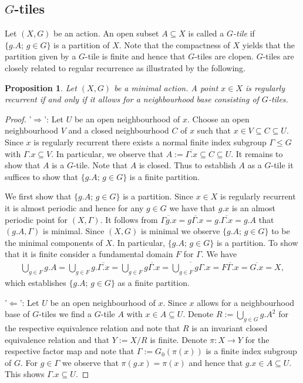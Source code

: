 \documentclass[12pt, reqno]{amsart}
\newtheorem{proposition}[theorem]{Proposition}
\theoremstyle{definition}
\theoremstyle{remark}
\numberwithin{equation}{section}
\theoremstyle{theorem}
\theoremstyle{remark}
\begin{document}
\subsection{$G$-tiles}
\label{subsec:RegularRecurrence_GTiles}
Let $(X,G)$ be an action. 
An open subset $A\subseteq X$ is called a \emph{$G$-tile} if $\{g.A;\, g\in G\}$ is a partition of $X$. Note that the compactness of $X$ yields that the partition given by a $G$-tile is finite and hence that $G$-tiles are clopen. $G$-tiles are closely related to regular recurrence as illustrated by the following. 

\begin{proposition}
\label{pro:regularlyRecurrentPointsAndGTiles}
    Let $(X,G)$ be a minimal action.
    A point $x\in X$ is regularly recurrent if and only if it allows for a neighbourhood base consisting of $G$-tiles. 
\end{proposition}
\begin{proof}
'$\Rightarrow$': 
    Let $U$ be an open neighbourhood of $x$. 
    Choose an open neighbourhood $V$ and a closed neighbourhood $C$ of $x$ such that $x\in V\subseteq C \subseteq U$. 
    Since $x$ is regularly recurrent there exists a normal finite index subgroup $\Gamma\leq G$ with $\Gamma.x\subseteq V$. 
    In particular, we observe that $A:=\overline{\Gamma.x}\subseteq C\subseteq U$. 
    It remains to show that $A$ is a $G$-tile. 
    Note that $A$ is closed. Thus to establish $A$ as a $G$-tile it suffices to show that $\{g.A;\, g\in G\}$ is a finite partition. 

    We first show that $\{g.A;\, g\in G\}$ is a partition.     
    Since $x\in X$ is regularly recurrent it is almost periodic and hence for any $g\in G$ we have that $g.x$ is an almost periodic point for $(X,\Gamma)$. 
    It follows from 
    $
        \overline{\Gamma g.x}
        =\overline{g\Gamma.x}
        =g.\overline{\Gamma.x}
        = g.A
    $
    that $(g.A,\Gamma)$ is minimal. Since $(X,G)$ is minimal we observe $\{g.A;\, g\in G\}$ to be the minimal components of $X$. In particular, $\{g.A;\, g\in G\}$ is a partition. 
    To show that it is finite consider a fundamental domain $F$ for $\Gamma$. 
    We have 
    \begin{align*}
        \bigcup_{g\in F}g.A
        = \bigcup_{g\in F}g.\overline{\Gamma.x}
        = \bigcup_{g\in F}\overline{g\Gamma.x}
        = \overline{\bigcup_{g\in F}g\Gamma.x}
        = \overline{F\Gamma.x}
        = \overline{G.x}
        =X,
    \end{align*}
    which establishes $\{g.A;\, g\in G\}$ as a finite partition. 

'$\Leftarrow$':
    Let $U$ be an open neighbourhood of $x$. 
    Since $x$ allows for a neighbourhood base of $G$-tiles we find a $G$-tile $A$ with $x\in A\subseteq U$. 
    Denote $R:=\bigcup_{g\in G}g.A^2$ for the respective equivalence relation and note that $R$ is an invariant closed equivalence relation and that $Y:=X/R$ is finite. Denote $\pi\colon X\to Y$ for the respective factor map and note that $\Gamma:=G_0(\pi(x))$ is a finite index subgroup of $G$. 
    For $g\in \Gamma$ we observe that $\pi(g.x)=\pi(x)$ and hence that $g.x\in A\subseteq U$. This shows $\Gamma.x\subseteq U$.
\end{proof}
\end{document}
